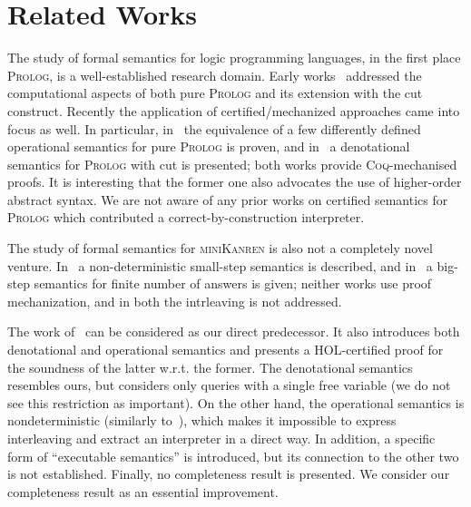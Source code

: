 \section{Related Works}

The study of formal semantics for logic programming languages, in the first place \textsc{Prolog}, is a well-established research domain. Early
works~\cite{JonesMycroftSemantics,DebrayMishraSemantics} addressed the computational aspects of both pure \textsc{Prolog} and its extension
with the cut construct. Recently the application of certified/mechanized approaches came into focus as well. In particular,
in~\cite{CertifiedPrologEquivalences} the equivalence of a few differently defined operational semantics
for pure \textsc{Prolog} is proven, and in~\cite{CeritfiedDenotationalCut} a denotational semantics for \textsc{Prolog} with cut is presented; both
works provide \textsc{Coq}-mechanised proofs. It is interesting that the former one also advocates the use of higher-order
abstract syntax. We are not aware of any prior works on certified semantics for \textsc{Prolog} which contributed a correct-by-construction
interpreter.

The study of formal semantics for \textsc{miniKanren} is also not a completely novel venture. In~\cite{RelConversion} a non-deterministic
small-step semantics is described, and in~\cite{DivTest} a big-step semantics for finite number of answers is given;
neither works use proof mechanization, and in both the intrleaving is not addressed. 

The work of~\citet{MechanisingMiniKanren} can be considered as our direct predecessor. It also introduces both denotational and
operational semantics and presents a HOL-certified proof for the soundness of the latter w.r.t. the former. The denotational
semantics resembles ours, but considers only queries with a single free variable (we do not see this restriction as important).
On the other hand, the operational semantics is nondeterministic (similarly to~\cite{RelConversion}), which makes it
impossible to express interleaving and extract an interpreter in a direct way. In addition, a specific form of ``executable semantics''
is introduced, but its connection to the other two is not established. Finally, no completeness result is presented.
We consider our completeness result as an essential improvement. 




